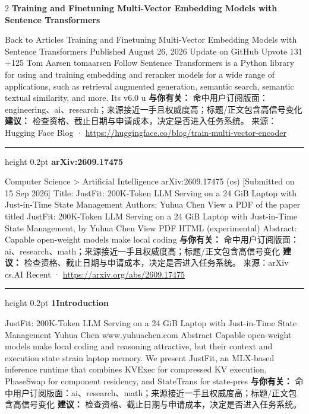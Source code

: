 \documentclass[10.5pt]{ctexart}
\begin{document}
\begin{multicols}{2}
{\large\bfseries Training and Finetuning Multi-Vector Embedding Models with Sentence Transformers}\par
Back to Articles Training and Finetuning Multi-Vector Embedding Models with Sentence Transformers Published August 26, 2026 Update on GitHub Upvote 131 +125 Tom Aarsen tomaarsen Follow Sentence Transformers is a Python library for using and training embedding and reranker models for a wide range of applications, such as retrieval augmented generation, semantic search, semantic textual similarity, and more. Its v6.0 u
\textbf{与你有关：} 命中用户订阅版面：engineering、ai、research；来源接近一手且权威度高；标题/正文包含高信号变化
\textbf{建议：} 检查资格、截止日期与申请成本，决定是否进入任务系统。
{\footnotesize\color{ormuted} 来源：Hugging Face Blog · \url{https://huggingface.co/blog/train-multi-vector-encoder}}
\vspace{2mm}
\hrule height 0.2pt
\vspace{2mm}
{\large\bfseries arXiv:2609.17475}\par
Computer Science > Artificial Intelligence arXiv:2609.17475 (cs) [Submitted on 15 Sep 2026] Title: JustFit: 200K-Token LLM Serving on a 24 GiB Laptop with Just-in-Time State Management Authors: Yuhua Chen View a PDF of the paper titled JustFit: 200K-Token LLM Serving on a 24 GiB Laptop with Just-in-Time State Management, by Yuhua Chen View PDF HTML (experimental) Abstract: Capable open-weight models make local coding
\textbf{与你有关：} 命中用户订阅版面：ai、research、math；来源接近一手且权威度高；标题/正文包含高信号变化
\textbf{建议：} 检查资格、截止日期与申请成本，决定是否进入任务系统。
{\footnotesize\color{ormuted} 来源：arXiv cs.AI Recent · \url{https://arxiv.org/abs/2609.17475}}
\vspace{2mm}
\hrule height 0.2pt
\vspace{2mm}
{\large\bfseries 1Introduction}\par
JustFit: 200K-Token LLM Serving on a 24 GiB Laptop with Just-in-Time State Management Yuhua Chen www.yuhuachen.com Abstract Capable open-weight models make local coding and reasoning attractive, but their context and execution state strain laptop memory. We present JustFit, an MLX-based inference runtime that combines KVExec for compressed KV execution, PhaseSwap for component residency, and StateTrans for state-pres
\textbf{与你有关：} 命中用户订阅版面：ai、research、math；来源接近一手且权威度高；标题/正文包含高信号变化
\textbf{建议：} 检查资格、截止日期与申请成本，决定是否进入任务系统。

\end{multicols}
\end{document}

